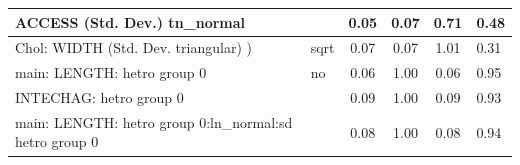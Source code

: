 \begin{table}
\begin{center}
\begin{tabular}{|l|l|c|c|c|l|}
			\hline
			ACCESS (Std. Dev.) tn_normal &  & 0.05 & 0.07 & 0.71 & 0.48 \\
			\hline
			 Chol: WIDTH (Std. Dev. triangular) ) & sqrt & 0.07 & 0.07 & 1.01 & 0.31 \\
			\hline
			main: LENGTH: hetro group 0 & no & 0.06 & 1.00 & 0.06 & 0.95 \\
			\hline
			INTECHAG: hetro group 0 &  & 0.09 & 1.00 & 0.09 & 0.93 \\
			\hline
			main: LENGTH: hetro group 0:ln_normal:sd  hetro group 0 &  & 0.08 & 1.00 & 0.08 & 0.94 \\
			\hline
		\end{tabular}
	\end{center}
\end{table}